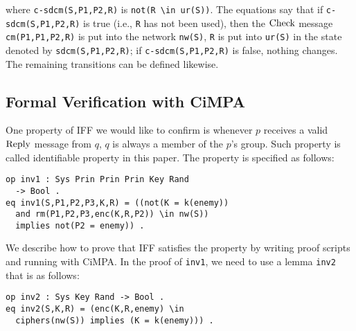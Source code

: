 \documentclass[10pt, conference, compsocconf]{IEEEtran}
\begin{document}
\noindent
where \verb!c-sdcm(S,P1,P2,R)! is \verb!not(R \in ur(S))!.
The equations say that if \verb!c-sdcm(S,P1,P2,R)! is true (i.e., \verb!R! has not been used), then the $\rm Check$ message \verb!cm(P1,P1,P2,R)! is put into the network \verb!nw(S)!, \verb!R! is put into \verb!ur(S)! in the state denoted by \verb!sdcm(S,P1,P2,R)!; if \verb!c-sdcm(S,P1,P2,R)! is false, nothing changes. 
%
The remaining transitions can be defined likewise.

\subsection{Formal Verification with CiMPA}
One property of IFF we would like to confirm is whenever $p$ receives a valid $\rm Reply$ message from $q$, $q$ is always a member of the $p$'s group. Such property is called identifiable property in this paper. The property is specified as follows:  

\begin{small}
	\begin{verbatim}
op inv1 : Sys Prin Prin Prin Key Rand 
  -> Bool .
eq inv1(S,P1,P2,P3,K,R) = ((not(K = k(enemy))
  and rm(P1,P2,P3,enc(K,R,P2)) \in nw(S)) 
  implies not(P2 = enemy)) .
	\end{verbatim}
\end{small}

We describe how to prove that IFF satisfies the property by writing proof scripts and running with CiMPA. In the proof of \verb!inv1!, we need to use a lemma \verb!inv2! that is as follows:
\begin{small}
	\begin{verbatim}
op inv2 : Sys Key Rand -> Bool .
eq inv2(S,K,R) = (enc(K,R,enemy) \in 
  ciphers(nw(S)) implies (K = k(enemy))) .
	\end{verbatim}
\end{small}
\end{document}
